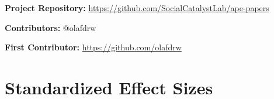 \documentclass[12pt]{article}
\begin{document}
\noindent\textbf{Project Repository:} \url{https://github.com/SocialCatalystLab/ape-papers}

\noindent\textbf{Contributors:} @olafdrw

\noindent\textbf{First Contributor:} \url{https://github.com/olafdrw}

\label{apep_main_text_end}

\newpage


\newpage
\appendix

\section{Standardized Effect Sizes}
\label{sec:sde}


\end{document}
